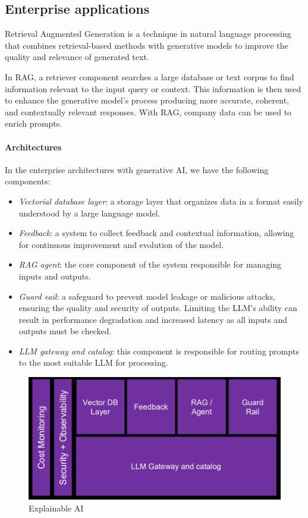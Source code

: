 \subsection{Enterprise applications}
\begin{definition}
    Retrieval Augmented Generation is a technique in natural language processing that combines retrieval-based methods with generative models to improve the quality and relevance of generated text.
\end{definition}
\noindent In RAG, a retriever component searches a large database or text corpus to find information relevant to the input query or context.
This information is then used to enhance the generative model's process producing more accurate, coherent, and contextually relevant responses. 
With RAG, company data can be used to enrich prompts. 

\paragraph*{Architectures}
\noindent In the enterprise architectures with generative AI, we have the following components:
\begin{itemize}
    \item \textit{Vectorial database layer}: a storage layer that organizes data in a format easily understood by a large language model.
    \item \textit{Feedback}: a system to collect feedback and contextual information, allowing for continuous improvement and evolution of the model.
    \item \textit{RAG agent}: the core component of the system responsible for managing inputs and outputs.
    \item \textit{Guard eail}: a safeguard to prevent model leakage or malicious attacks, ensuring the quality and security of outputs. 
        Limiting the LLM's ability can result in performance degradation and increased latency as all inputs and outputs must be checked.
    \item \textit{LLM gateway and catalog}: this component is responsible for routing prompts to the most suitable LLM for processing.
\end{itemize}

\begin{figure}[H]
    \centering
    \includegraphics[width=0.5\linewidth]{images/bis7.png}
    \caption{Explainable AI}
\end{figure}